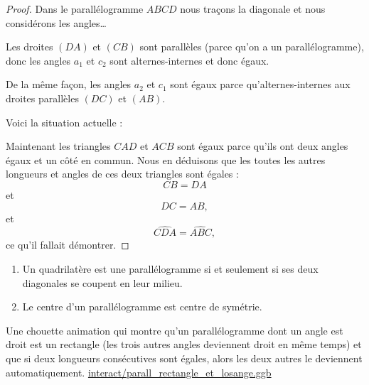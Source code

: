\begin{proof}
    Dans le parallélogramme \( ABCD\) nous traçons la diagonale et nous considérons les angles\ldots

\begin{center}
   
\end{center}

    Les droites \( (DA)\) et \( (CB)\) sont parallèles (parce qu'on a un parallélogramme), donc les angles \( a_1\) et \( c_2\) sont alternes-internes et donc égaux.

    De la même façon, les angles \( a_2\) et \( c_1\) sont égaux parce qu'alternes-internes aux droites parallèles \( (DC)\) et \( (AB)\).

    Voici la situation actuelle :
    \begin{center}
        
    \end{center}
    Maintenant les triangles \( CAD\) et \( ACB\) sont égaux parce qu'ils ont deux angles égaux et un côté en commun. Nous en déduisons que les toutes les autres longueurs et angles de ces deux triangles sont égales :
    \begin{equation}
        CB=DA
    \end{equation}
    et
    \begin{equation}
        DC=AB,
    \end{equation}
    et
    \begin{equation}
     \widehat{CDA}=\widehat{ABC},
    \end{equation}
    ce qu'il fallait démontrer.
\end{proof}

\begin{propriete}
    \begin{enumerate}
        \item
            Un quadrilatère est une parallélogramme si et seulement si ses deux diagonales se coupent en leur milieu.
        \item
            Le centre d'un parallélogramme est centre de symétrie.
    \end{enumerate}
\end{propriete}


\begin{center}
   
\end{center}

Une chouette animation qui montre qu'un parallélogramme dont un angle est droit est un rectangle (les trois autres angles deviennent droit en même temps) et que si deux longueurs consécutives sont égales, alors les deux autres le deviennent automatiquement.
\url{interact/parall_rectangle_et_losange.ggb}

